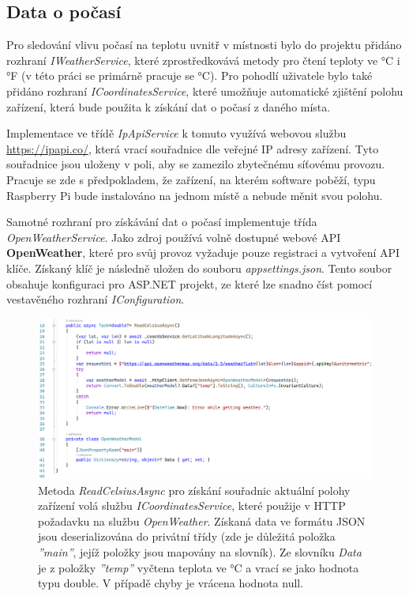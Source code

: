 \subsection{Data o počasí}
Pro sledování vlivu počasí na teplotu uvnitř v místnosti bylo do projektu přidáno rozhraní {\it IWeatherService}, které zprostředkovává metody pro čtení teploty ve °C i °F (v této práci se primárně pracuje se °C). Pro pohodlí uživatele bylo také přidáno rozhraní {\it ICoordinatesService}, které umožňuje automatické zjištění polohu zařízení, která bude použita k získání dat o počasí z daného místa.

Implementace ve třídě {\it IpApiService} k tomuto využívá webovou službu \url{https://ipapi.co/}, která vrací souřadnice dle veřejné IP adresy zařízení. Tyto souřadnice jsou uloženy v poli, aby se zamezilo zbytečnému síťovému provozu. Pracuje se zde s předpokladem, že zařízení, na kterém software poběží, typu Raspberry Pi bude instalováno na jednom místě a nebude měnit svou polohu.

Samotné rozhraní pro získávání dat o počasí implementuje třída {\it OpenWeatherService}. Jako zdroj používá volně dostupné webové API \textbf{OpenWeather}, které pro svůj provoz vyžaduje pouze registraci a vytvoření API klíče. Získaný klíč je následně uložen do souboru {\it appsettings.json}. Tento soubor obsahuje konfiguraci pro ASP.NET projekt, ze které lze snadno číst pomocí vestavěného rozhraní {\it IConfiguration}.

\begin{figure}[hbt]
\includegraphics[width=1.05\textwidth]{obrazky-figures/code-openweather-read.png}
\caption{Metoda {\it ReadCelsiusAsync} pro získání souřadnic aktuální polohy zařízení volá službu {\it ICoordinatesService}, které použije v HTTP požadavku na službu {\it OpenWeather}. Získaná data ve formátu JSON jsou deserializována do privátní třídy (zde je důležitá položka {\it ''main''}, jejíž položky jsou mapovány na slovník). Ze slovníku {\it Data} je z položky {\it ''temp''} vyčtena teplota ve °C a vrací se jako hodnota typu double. V případě chyby je vrácena hodnota null.}
\end{figure}

